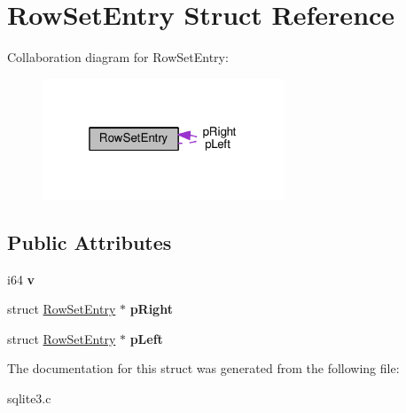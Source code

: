 \hypertarget{structRowSetEntry}{}\section{Row\+Set\+Entry Struct Reference}
\label{structRowSetEntry}


Collaboration diagram for Row\+Set\+Entry\+:\nopagebreak
\begin{figure}[H]
\begin{center}
\leavevmode
\includegraphics[width=205pt]{structRowSetEntry__coll__graph}
\end{center}
\end{figure}
\subsection*{Public Attributes}
\begin{DoxyCompactItemize}
\item 
i64 {\bfseries v}\hypertarget{structRowSetEntry_ac72670935246f1bff5e4d96703574071}{}\label{structRowSetEntry_ac72670935246f1bff5e4d96703574071}

\item 
struct \hyperlink{structRowSetEntry}{Row\+Set\+Entry} $\ast$ {\bfseries p\+Right}\hypertarget{structRowSetEntry_ac39c09525dd24f42af522587d1bc5026}{}\label{structRowSetEntry_ac39c09525dd24f42af522587d1bc5026}

\item 
struct \hyperlink{structRowSetEntry}{Row\+Set\+Entry} $\ast$ {\bfseries p\+Left}\hypertarget{structRowSetEntry_a59365203c30ce782ae38e534c90db14b}{}\label{structRowSetEntry_a59365203c30ce782ae38e534c90db14b}

\end{DoxyCompactItemize}


The documentation for this struct was generated from the following file\+:\begin{DoxyCompactItemize}
\item 
sqlite3.\+c\end{DoxyCompactItemize}

